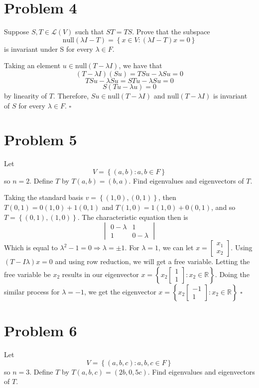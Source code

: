\documentclass[12pt]{article}
\newcommand{\R}{\mathbb{R}}
\newcommand{\set}[1]{\left\{ #1\right\}}
\newenvironment{proof}{\noindent{\bf Proof.}}{\hfill $\square$\medskip}
\begin{document}
\section{Problem 4}
Suppose $S,T\in \mathcal{L}(V)$ such that $ST=TS$. Prove that the subspace
$$\text{null}(\lambda I-T)=\set{x\in V:(\lambda I-T)x=0}$$
is invariant under S for every $\lambda\in F$.

\begin{proof}
Taking an element $u\in\text{null}(T-\lambda I)$, we have that $$(T-\lambda I)(Su)=TSu-\lambda Su=0$$
$$TSu-\lambda Su= STu-\lambda Su=0$$
$$S(Tu-\lambda u)=0$$
by linearity of $T$. Therefore, $Su\in\text{null}(T-\lambda I)$ and
$\text{null}(T-\lambda I)$ is invariant of $S$ for every $\lambda\in F$.
\end{proof}


\section{Problem 5}
Let
$$V=\set{(a,b):a,b\in F}$$
so $n=2$. Define $T$ by $T(a,b)=(b,a)$. Find eigenvalues and eigenvectors of $T$.

\begin{proof}
Taking the standard basis $v=\set{(1,0),(0,1)}$, then $T(0,1)=0(1,0)+1(0,1)$ and $T(1,0)=1(1,0)+0(0,1)$, and so $T=\set{(0,1),(1,0)}$. The characteristic equation then is
$$
\begin{vmatrix}
0-\lambda & 1\\
1 & 0-\lambda
\end{vmatrix}
$$
Which is equal to $\lambda^{2}-1=0\Rightarrow\lambda=\pm 1$. For $\lambda=1$, we can let $x=\begin{bmatrix}x_{1}\\x_{2}\end{bmatrix}$. Using $(T-I\lambda)x=0$ and using row reduction, we will get a free variable. Letting the free variable be $x_{2}$ results in our eigenvector $x=\set{x_{2}\begin{bmatrix}1\\1\end{bmatrix}:x_{2}\in\R}$. Doing the similar process for $\lambda=-1$, we get the eigenvector $x=\set{x_{2}\begin{bmatrix}-1\\1\end{bmatrix}:x_{2}\in\R}$
\end{proof}


\section{Problem 6}
Let
$$V=\set{(a,b,c):a,b,c\in F}$$
so $n=3$. Define $T$ by $T(a,b,c)=(2b,0,5c)$. Find eigenvalues and eigenvectors of $T$.
\end{document}
